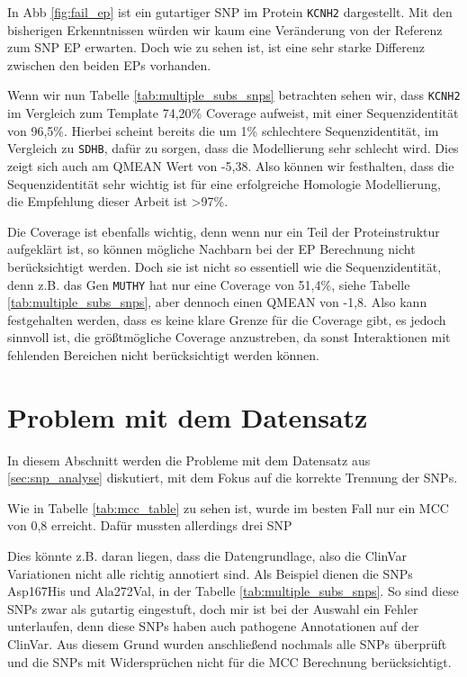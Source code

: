 In \ac{Abb} \ref{fig:fail_ep} ist ein gutartiger \ac{SNP} im Protein \texttt{KCNH2} dargestellt. Mit den bisherigen Erkenntnissen würden wir kaum eine Veränderung von der Referenz zum \ac{SNP} \ac{EP} erwarten. Doch wie zu sehen ist, ist eine sehr starke Differenz zwischen den beiden \ac{EP}s vorhanden. 

Wenn wir nun Tabelle \ref{tab:multiple_subs_snps} betrachten sehen wir, dass \texttt{KCNH2} im Vergleich zum Template 74,20\% Coverage aufweist, mit einer Sequenzidentität von 96,5\%. Hierbei scheint bereits die um 1\% schlechtere Sequenzidentität, im Vergleich zu \texttt{SDHB}, dafür zu sorgen, dass die Modellierung sehr schlecht wird. Dies zeigt sich auch am QMEAN Wert von -5,38. Also können wir festhalten, dass die Sequenzidentität sehr wichtig ist für eine erfolgreiche Homologie Modellierung, die Empfehlung dieser Arbeit ist >97\%.

Die Coverage ist ebenfalls wichtig, denn wenn nur ein Teil der Proteinstruktur aufgeklärt ist, so können mögliche Nachbarn bei der \ac{EP} Berechnung nicht berücksichtigt werden. Doch sie ist nicht so essentiell wie die Sequenzidentität, denn z.B. das Gen \texttt{MUTHY} hat nur eine Coverage von 51,4\%, siehe Tabelle \ref{tab:multiple_subs_snps}, aber dennoch einen QMEAN von -1,8. Also kann festgehalten werden, dass es keine klare Grenze für die Coverage gibt, es jedoch sinnvoll ist, die größtmögliche Coverage anzustreben, da sonst Interaktionen mit fehlenden Bereichen nicht berücksichtigt werden können.




\section{Problem mit dem Datensatz}
\label{sec:probleme_mit_dem_datensatz}

In diesem Abschnitt werden die Probleme mit dem Datensatz aus \ref{sec:snp_analyse} diskutiert, mit dem Fokus auf die korrekte Trennung der \ac{SNP}s.

Wie in Tabelle \ref{tab:mcc_table} zu sehen ist, wurde im besten Fall nur ein MCC von 0,8 erreicht. Dafür mussten allerdings drei \ac{SNP}


Dies könnte z.B. daran liegen, dass die Datengrundlage, also die ClinVar Variationen nicht alle richtig annotiert sind. Als Beispiel dienen die \ac{SNP}s Asp167His und Ala272Val, in der Tabelle \ref{tab:multiple_subs_snps}. So sind diese \ac{SNP}s zwar als gutartig eingestuft, doch mir ist bei der Auswahl ein Fehler unterlaufen, denn diese \ac{SNP}s haben auch pathogene Annotationen auf der ClinVar. Aus diesem Grund wurden anschließend nochmals alle \ac{SNP}s überprüft und die \ac{SNP}s mit Widersprüchen nicht für die MCC Berechnung berücksichtigt.

